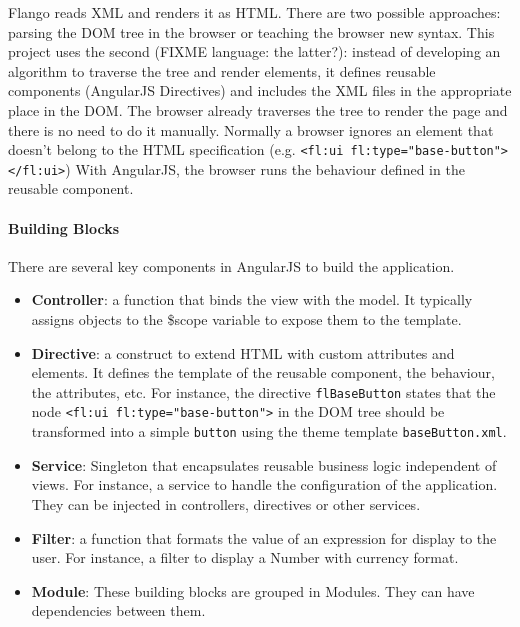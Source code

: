 Flango \cm reads \ac{XML} and renders it as \ac{HTML}.
There are two possible approaches: parsing the \ac{DOM} tree in the browser or teaching the browser new syntax.
This project uses the second (FIXME language: the latter?): instead of developing an algorithm to traverse the tree and render elements, it defines reusable components (AngularJS Directives) and includes the \ac{XML} files in the appropriate place in the \ac{DOM}. 
The browser already traverses the tree to render the page and there is no need to do it manually.
Normally a browser ignores an element that doesn't belong to the \ac{HTML} specification (e.g. \lstinline$<fl:ui fl:type="base-button"></fl:ui>$)
With AngularJS, the browser runs the behaviour defined in the reusable component.

\paragraph{Building Blocks} There are several key components in AngularJS to build the application.

\begin{itemize}
    \item \textbf{Controller}: a function that binds the view with the model. It typically assigns objects to the \$scope variable to expose them to the template.
    \item \textbf{Directive}: a construct to extend HTML with custom attributes and elements. It defines the template of the reusable component, the behaviour, the attributes, etc. For instance, the directive \texttt{flBaseButton} states that the node \lstinline$<fl:ui fl:type="base-button">$ in the \ac{DOM} tree should be transformed into a simple \texttt{button} using the theme template \texttt{baseButton.xml}. 
    \item \textbf{Service}: Singleton that encapsulates reusable business logic independent of views. For instance, a service to handle the configuration of the application. They can be injected in controllers, directives or other services.
    \item \textbf{Filter}: a function that formats the value of an expression for display to the user. For instance, a filter to display a Number with currency format.
    \item \textbf{Module}: These building blocks are grouped in Modules. They can have dependencies between them.
\end{itemize}


